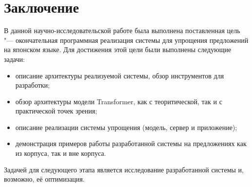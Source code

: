\chapter*{Заключение} \label{ch-conclusion}

В данной научно-исследовательской работе была выполнена поставленная цель "--- окончательная программная реализация системы для упрощения предложений на японском языке. Для достижения этой цели были выполнены следующие задачи:
\begin{itemize}%
  \item описание архитектуры реализуемой системы, обзор инструментов для разработки;
  \item обзор архитектуры модели Transformer, как с теоритической, так и с практической точек зрения;
  \item описание реализации системы упрощения (модель, сервер и приложение);
  \item демонстрация примеров работы разработанной системы на предложениях как из корпуса, так и вне корпуса.
\end{itemize}

Задачей для следующего этапа является исследование разработанной системы и, возможно, её оптимизация.

